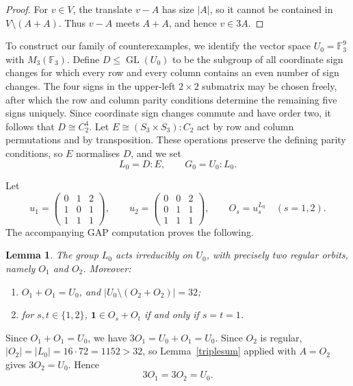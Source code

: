 \documentclass[a4paper,reqno,11pt]{amsart}
\newcommand\F{\mathbb{F}}
\newcommand\GL{\operatorname{GL}}
\newtheorem{lem}[thm]{Lemma}
\numberwithin{equation}{section}
\begin{document}
\begin{proof}
For $v\in V$, the translate $v-A$ has size $|A|$, so it cannot be contained in $V\setminus(A+A)$. Thus $v-A$ meets $A+A$, and hence $v\in3A$.
\end{proof}

To construct our family of counterexamples, we identify the vector
space $U_0=\F_3^9$ with $M_3(\F_3)$. Define $D\le\GL(U_0)$ to be the
subgroup of all coordinate sign changes for which every row and every
column contains an even number of sign changes. The four signs in the upper-left $2\times2$ submatrix may be chosen freely, after which the row and column parity conditions determine the remaining five signs uniquely. Since coordinate sign changes commute
and have order two, it follows that $D\cong C_2^4$. Let
$E\cong(S_3\times S_3){:}C_2$ act by row and column permutations and
by transposition. These operations preserve the defining parity
conditions, so $E$ normalises $D$, and we set
\[
L_0=D{:}E,
\qquad
G_0=U_0{:}L_0.
\]

Let
\[
u_1=\begin{pmatrix}
0&1&2\\
1&0&1\\
1&1&1
\end{pmatrix},
\qquad
u_2=\begin{pmatrix}
0&0&2\\
0&1&1\\
1&1&1
\end{pmatrix},
\qquad
O_s=u_s^{L_0}\quad(s=1,2).
\]
The accompanying GAP computation proves the following.

\begin{lem}\label{affineinput}
The group $L_0$ acts irreducibly on $U_0$, with precisely two regular orbits, namely $O_1$ and $O_2$. Moreover:
\begin{enumerate}
\item[{(i)}] $O_1+O_1=U_0$, and $|U_0\setminus(O_2+O_2)|=32$;
\item[{(ii)}] for $s,t\in\{1,2\}$, $\mathbf1\in O_s+O_t$ if and only if $s=t=1$.
\end{enumerate}
\end{lem}

Since $O_1+O_1=U_0$, we have $3O_1=U_0+O_1=U_0$. Since $O_2$ is regular, $|O_2|=|L_0|=16\cdot72=1152>32$, so Lemma~\ref{triplesum} applied with $A=O_2$ gives $3O_2=U_0$. Hence
\begin{equation}\label{eq:triple}
3O_1=3O_2=U_0.
\end{equation}
\end{document}
